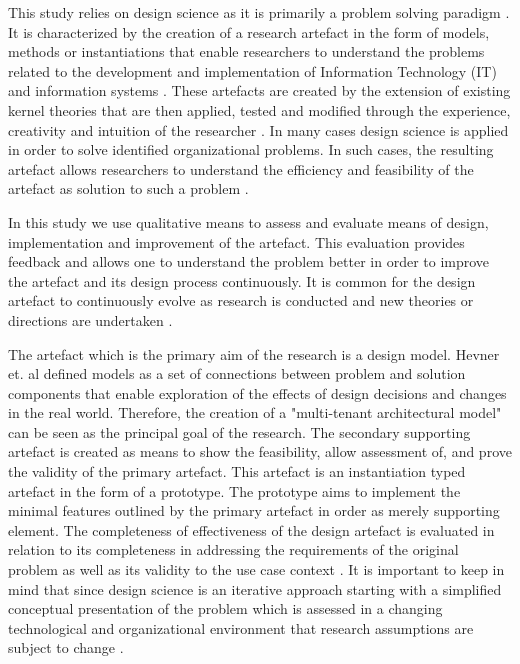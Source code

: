 This study relies on design science as it is primarily a problem solving paradigm \cite{Hevner2004}. It is characterized by the creation of a research artefact in the form of models, methods or instantiations that enable researchers to understand the problems related to the development and implementation of Information Technology (IT) and information systems \cite{March1995a}. These artefacts are created by the extension of existing kernel theories that are then applied, tested and modified through the experience, creativity and intuition of the researcher \cite{Walls1992}. In many cases design science is applied in order to solve identified organizational problems. In such cases, the resulting artefact allows researchers to understand the efficiency and feasibility of the artefact as solution to such a problem \cite{Hevner2004}.
 
In this study we use qualitative means to assess and evaluate means of design, implementation and improvement of the artefact. This evaluation provides feedback and allows one to understand the problem better in order to improve the artefact and its design process continuously. It is common for the design artefact to continuously evolve as research is conducted and new theories or directions are undertaken \cite{Hevner2004}.
 
The artefact which is the primary aim of the research is a design model. Hevner et. al \cite{Hevner2004} defined models as a set of connections between problem and solution components that enable exploration of the effects of design decisions and changes in the real world. Therefore, the creation of a "multi-tenant architectural model" can be seen as the principal goal of the research. The secondary supporting artefact is created as means to show the feasibility, allow assessment of, and prove the validity of the primary artefact. This artefact is an instantiation typed artefact \cite{Hevner2004} in the form of a prototype. The prototype aims to implement the minimal features outlined by the primary artefact in order as merely supporting element. The completeness of effectiveness of the design artefact is evaluated in relation to its completeness in addressing the requirements of the original problem as well as its validity to the use case context \cite{Hevner2004}. It is important to keep in mind that since design science is an iterative approach starting with a simplified conceptual presentation of the problem which is assessed in a changing technological and organizational environment that research assumptions are subject to change \cite{Johansson2000}.


